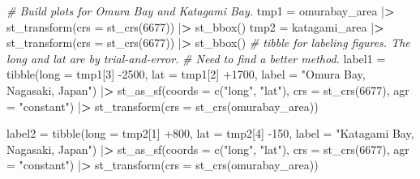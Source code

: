 \documentclass[
]{book}
\newenvironment{Shaded}{\begin{snugshade}}{\end{snugshade}}
\newcommand{\AttributeTok}[1]{\textcolor[rgb]{0.77,0.63,0.00}{#1}}
\newcommand{\CommentTok}[1]{\textcolor[rgb]{0.56,0.35,0.01}{\textit{#1}}}
\newcommand{\DecValTok}[1]{\textcolor[rgb]{0.00,0.00,0.81}{#1}}
\newcommand{\ErrorTok}[1]{\textcolor[rgb]{0.64,0.00,0.00}{\textbf{#1}}}
\newcommand{\FunctionTok}[1]{\textcolor[rgb]{0.00,0.00,0.00}{#1}}
\newcommand{\NormalTok}[1]{#1}
\newcommand{\OtherTok}[1]{\textcolor[rgb]{0.56,0.35,0.01}{#1}}
\newcommand{\SpecialCharTok}[1]{\textcolor[rgb]{0.00,0.00,0.00}{#1}}
\newcommand{\StringTok}[1]{\textcolor[rgb]{0.31,0.60,0.02}{#1}}
\theoremstyle{definition}
\theoremstyle{definition}
\theoremstyle{definition}
\theoremstyle{definition}
\theoremstyle{remark}
\begin{document}
\begin{Shaded}
\begin{Highlighting}[]
\CommentTok{\# Build plots for Omura Bay and Katagami Bay.}
\NormalTok{tmp1 }\OtherTok{=}\NormalTok{ omurabay\_area }\SpecialCharTok{|}\ErrorTok{\textgreater{}} \FunctionTok{st\_transform}\NormalTok{(}\AttributeTok{crs =} \FunctionTok{st\_crs}\NormalTok{(}\DecValTok{6677}\NormalTok{)) }\SpecialCharTok{|}\ErrorTok{\textgreater{}} \FunctionTok{st\_bbox}\NormalTok{()}
\NormalTok{tmp2 }\OtherTok{=}\NormalTok{ katagami\_area }\SpecialCharTok{|}\ErrorTok{\textgreater{}} \FunctionTok{st\_transform}\NormalTok{(}\AttributeTok{crs =} \FunctionTok{st\_crs}\NormalTok{(}\DecValTok{6677}\NormalTok{)) }\SpecialCharTok{|}\ErrorTok{\textgreater{}} \FunctionTok{st\_bbox}\NormalTok{()}
\CommentTok{\# tibble for labeling figures. The long and lat are by trial{-}and{-}error.}
\CommentTok{\# Need to find a better method.}
\NormalTok{label1 }\OtherTok{=} \FunctionTok{tibble}\NormalTok{(}\AttributeTok{long =}\NormalTok{ tmp1[}\DecValTok{3}\NormalTok{] }\SpecialCharTok{{-}}\DecValTok{2500}\NormalTok{,}
                \AttributeTok{lat =}\NormalTok{ tmp1[}\DecValTok{2}\NormalTok{] }\SpecialCharTok{+}\DecValTok{1700}\NormalTok{,}
                \AttributeTok{label =} \StringTok{"Omura Bay, Nagasaki, Japan"}\NormalTok{) }\SpecialCharTok{|}\ErrorTok{\textgreater{}} 
  \FunctionTok{st\_as\_sf}\NormalTok{(}\AttributeTok{coords =} \FunctionTok{c}\NormalTok{(}\StringTok{"long"}\NormalTok{, }\StringTok{"lat"}\NormalTok{), }\AttributeTok{crs =} \FunctionTok{st\_crs}\NormalTok{(}\DecValTok{6677}\NormalTok{), }\AttributeTok{agr =} \StringTok{"constant"}\NormalTok{) }\SpecialCharTok{|}\ErrorTok{\textgreater{}} 
  \FunctionTok{st\_transform}\NormalTok{(}\AttributeTok{crs =} \FunctionTok{st\_crs}\NormalTok{(omurabay\_area))}

\NormalTok{label2 }\OtherTok{=} \FunctionTok{tibble}\NormalTok{(}\AttributeTok{long =}\NormalTok{ tmp2[}\DecValTok{1}\NormalTok{] }\SpecialCharTok{+}\DecValTok{800}\NormalTok{,}
                \AttributeTok{lat =}\NormalTok{ tmp2[}\DecValTok{4}\NormalTok{] }\SpecialCharTok{{-}}\DecValTok{150}\NormalTok{,}
                \AttributeTok{label =} \StringTok{"Katagami Bay, Nagasaki, Japan"}\NormalTok{) }\SpecialCharTok{|}\ErrorTok{\textgreater{}} 
  \FunctionTok{st\_as\_sf}\NormalTok{(}\AttributeTok{coords =} \FunctionTok{c}\NormalTok{(}\StringTok{"long"}\NormalTok{, }\StringTok{"lat"}\NormalTok{), }\AttributeTok{crs =} \FunctionTok{st\_crs}\NormalTok{(}\DecValTok{6677}\NormalTok{), }\AttributeTok{agr =} \StringTok{"constant"}\NormalTok{) }\SpecialCharTok{|}\ErrorTok{\textgreater{}} 
  \FunctionTok{st\_transform}\NormalTok{(}\AttributeTok{crs =} \FunctionTok{st\_crs}\NormalTok{(omurabay\_area))}
\end{Highlighting}
\end{Shaded}
\end{document}
